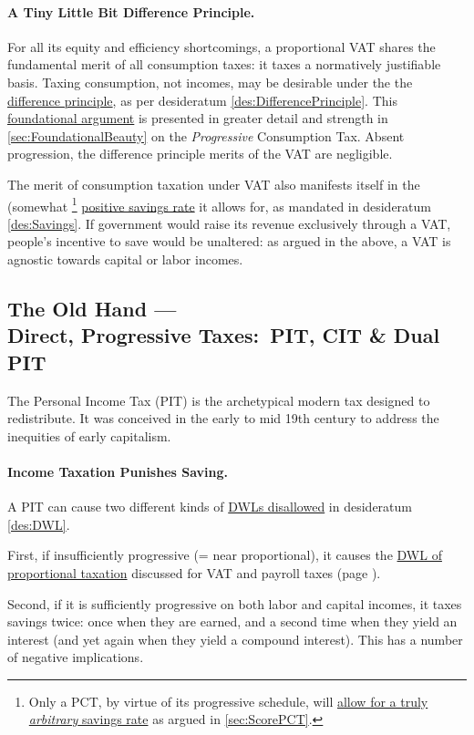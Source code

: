 \paragraph{A Tiny Little Bit Difference Principle.} For all its equity and efficiency shortcomings, a proportional VAT shares the fundamental merit of all consumption taxes:
it taxes a normatively justifiable basis.
Taxing consumption, not incomes, may be desirable under the the \hyperref[des:DifferencePrinciple]{difference principle}, as per desideratum \ref{des:DifferencePrinciple}.
This \hyperref[sec:FoundationalBeauty]{foundational argument} is presented in greater detail and strength in \ref{sec:FoundationalBeauty} on the \emph{Progressive} Consumption Tax.
Absent progression, the difference principle merits of the VAT are negligible.

The merit of consumption taxation under VAT also manifests itself in the (somewhat
\footnote{
	Only a PCT, by virtue of its progressive schedule, will \hyperref[sec:ScorePCT]{allow for a truly \emph{arbitrary} savings rate} as argued in \autoref{sec:ScorePCT}.
}
\hyperref[des:Savings]{positive savings rate} it allows for, as mandated in desideratum \ref{des:Savings}.
If government would raise its revenue exclusively through a VAT, people's incentive to save would be unaltered:
as argued in the above, a VAT is agnostic towards capital or labor incomes.

\subsection[Direct, Progressive Taxes]{The Old Hand ---\\Direct, Progressive Taxes:~PIT, CIT \& Dual PIT} \label{sec:ScorePIT} The Personal Income Tax (PIT) is the archetypical modern tax designed to redistribute.
It was conceived in the early to mid 19th century to address the inequities of early capitalism.

\paragraph{Income Taxation Punishes Saving.} A PIT can cause two different kinds of \hyperref[des:DWL]{DWLs disallowed} in desideratum \ref{des:DWL}.

First, if insufficiently progressive (= near proportional), it causes the \hyperref[sec:PropTaxDWL]{DWL of proportional taxation} discussed for VAT and payroll taxes (page \pageref{sec:PropTaxDWL}).

Second, if it is sufficiently progressive on both labor and capital incomes, it taxes savings twice:
once when they are earned, and a second time when they yield an interest (and yet again when they yield a compound interest).
This has a number of negative implications.

